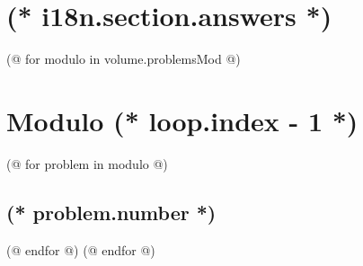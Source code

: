 \documentclass[12pt, twoside]{article}
\newcounter{volume}
\newcounter{problem}
\begin{document}
            
    \pagestyle{main}
    \thispagestyle{first}
    \vspace*{2em}
   
    \section{(* i18n.section.answers *)}
    \pagestyle{answers}
    (@ for modulo in volume.problemsMod @)
        \newpage%
        \section{Modulo (* loop.index - 1 *)}
        (@ for problem in modulo @)%
            \setcounter{volume}{(* volume.number *)}%
            \setcounter{problem}{(* problem.number *)}%
            \subsection{(* problem.number *)}%
        (@ endfor @)
    (@ endfor @)
\end{document}
